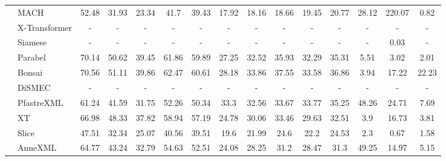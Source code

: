 \begin{table*}
{\begin{tabular}{@{}c|l|ccccc|ccccc|ccc@{}}
	& MACH	 & 52.48	 & 31.93	 & 23.34	 & 41.7	 & 39.43	 & 17.92	 & 18.16	 & 18.66	 & 19.45	 & 20.77	 & 28.12	 & 220.07	 & 0.82\\
	& X-Transformer	 & -	 & -	 & -	 & -	 & -	 & -	 & -	 & -	 & -	 & -	 & -	 & -	 & -\\
	& Siamese	 & -	 & -	 & -	 & -	 & -	 & -	 & -	 & -	 & -	 & -	 & -	 & 0.03	 & -\\
	& Parabel	 & 70.14	 & 50.62	 & 39.45	 & 61.86	 & 59.89	 & 27.25	 & 32.52	 & 35.93	 & 32.29	 & 35.31	 & 5.51	 & 3.02	 & 2.01\\
	& Bonsai	 & 70.56	 & 51.11	 & 39.86	 & 62.47	 & 60.61	 & 28.18	 & 33.86	 & 37.55	 & 33.58	 & 36.86	 & 3.94	 & 17.22	 & 22.23\\
	& DiSMEC	 & -	 & -	 & -	 & -	 & -	 & -	 & -	 & -	 & -	 & -	 & -	 & -	 & -\\
	& PfastreXML	 & 61.24	 & 41.59	 & 31.75	 & 52.26	 & 50.34	 & 33.3	 & 32.56	 & 33.67	 & 33.77	 & 35.25	 & 48.26	 & 24.71	 & 7.69\\
	& XT	 & 66.98	 & 48.33	 & 37.82	 & 58.94	 & 57.19	 & 24.78	 & 30.06	 & 33.46	 & 29.63	 & 32.51	 & 3.9	 & 16.73	 & 3.81\\
	& Slice	 & 47.51	 & 32.34	 & 25.07	 & 40.56	 & 39.51	 & 19.6	 & 21.99	 & 24.6	 & 22.2	 & 24.53	 & 2.3	 & 0.67	 & 1.58\\
	& AnneXML	 & 64.77	 & 43.24	 & 32.79	 & 54.63	 & 52.51	 & 24.08	 & 28.25	 & 31.2	 & 28.47	 & 31.3	 & 49.25	 & 14.97	 & 5.15\\
	 \bottomrule
    \end{tabular}
    }
\end{table*}

